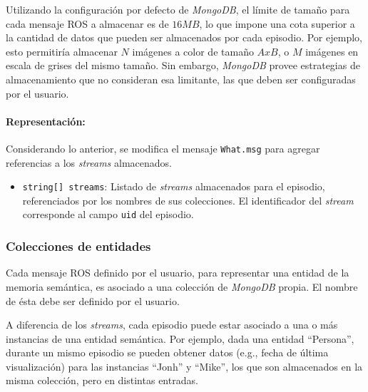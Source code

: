 Utilizando la configuración por defecto de \textit{MongoDB}, el límite de tamaño para cada mensaje ROS a almacenar es de $16 MB$, lo que impone una cota superior a la cantidad de datos que pueden ser almacenados por cada episodio. Por ejemplo, esto permitiría almacenar $N$ imágenes a color de tamaño $AxB$, o $M$ imágenes en escala de grises del mismo tamaño. Sin embargo, \textit{MongoDB} provee estrategias de almacenamiento que no consideran esa limitante, las que deben ser configuradas por el usuario.




\paragraph{Representación:}
Considerando lo anterior, se modifica el mensaje \texttt{What.msg} para agregar referencias a los \textit{streams} almacenados.
\begin{itemize}
	\item \texttt{string[] streams}: Listado de \textit{streams} almacenados para el episodio,  referenciados por los nombres de sus colecciones. El identificador del \textit{stream} corresponde al campo \texttt{uid} del episodio.
\end{itemize}


\subsubsection{Colecciones de entidades}

Cada mensaje ROS definido por el usuario, para representar una entidad de la memoria semántica, es  asociado a una colección de \textit{MongoDB} propia. El nombre de ésta debe ser definido por el usuario. 

A diferencia de los \textit{streams}, cada episodio puede estar asociado a una o más instancias de una entidad semántica. Por ejemplo, dada una entidad ``Persona'', durante un mismo episodio se pueden obtener datos (e.g., fecha de última visualización) para las instancias ``Jonh'' y ``Mike'', los que son almacenados en la misma colección, pero en distintas entradas.

